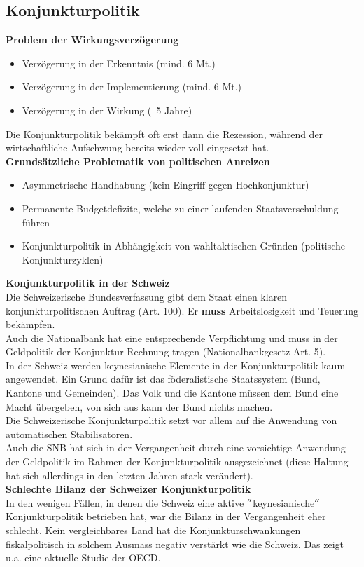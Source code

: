 \subsection{Konjunkturpolitik}
\textbf{Problem der Wirkungsverzögerung}\\
\begin{itemize}
	\item Verzögerung in der Erkenntnis (mind. 6 Mt.)
	\item Verzögerung in der Implementierung (mind. 6 Mt.)
	\item Verzögerung in der Wirkung (~5 Jahre)
\end{itemize}
Die Konjunkturpolitik bekämpft oft erst dann die Rezession, während der wirtschaftliche Aufschwung bereits wieder voll eingesetzt hat.\\
\textbf{Grundsätzliche Problematik von politischen Anreizen}
\begin{itemize}
	\item Asymmetrische Handhabung (kein Eingriff gegen Hochkonjunktur)
	\item Permanente Budgetdefizite, welche zu einer laufenden Staatsverschuldung führen
	\item Konjunkturpolitik in Abhängigkeit von wahltaktischen Gründen (politische Konjunkturzyklen)
\end{itemize}
\textbf{Konjunkturpolitik in der Schweiz}\\
Die Schweizerische Bundesverfassung gibt dem Staat einen klaren konjunkturpolitischen Auftrag (Art. 100). Er \textbf{muss} Arbeitslosigkeit und Teuerung bekämpfen.\\
Auch die Nationalbank hat eine entsprechende Verpflichtung und muss in der Geldpolitik der Konjunktur Rechnung tragen (Nationalbankgesetz Art. 5).\\
In der Schweiz werden keynesianische Elemente in der Konjunkturpolitik kaum angewendet. Ein Grund dafür ist das föderalistische Staatssystem (Bund, Kantone und Gemeinden). Das Volk und die Kantone müssen dem Bund eine Macht übergeben, von sich aus kann der Bund nichts machen.\\
Die Schweizerische Konjunkturpolitik setzt vor allem auf die Anwendung von automatischen Stabilisatoren.\\
Auch die SNB hat sich in der Vergangenheit durch eine vorsichtige Anwendung der Geldpolitik im Rahmen der Konjunkturpolitik ausgezeichnet (diese Haltung hat sich allerdings in den letzten Jahren stark verändert).\\
\textbf{Schlechte Bilanz der Schweizer Konjunkturpolitik}\\
In den wenigen Fällen, in denen die Schweiz eine aktive $"$keynesianische$"$ Konjunkturpolitik betrieben hat, war die Bilanz in der Vergangenheit eher schlecht. Kein vergleichbares Land hat die Konjunkturschwankungen fiskalpolitisch in solchem Ausmass negativ verstärkt wie die Schweiz. Das zeigt u.a. eine aktuelle Studie der OECD.
\clearpage
\pagebreak

